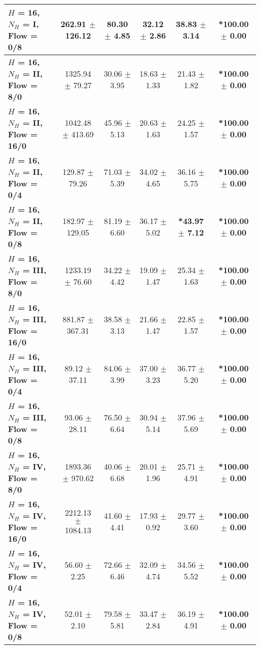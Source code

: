\begin{table*}[ht]
{\begin{tabular}{lccccc}
        \textbf{$H$ = 16, $N_H$ = I, Flow = 0/8} & 262.91 $\pm$ 126.12 & 80.30 $\pm$ 4.85 & 32.12 $\pm$ 2.86 & 38.83 $\pm$ 3.14 & \textbf{*100.00 $\pm$ 0.00} \\
        \midrule
        \textbf{$H$ = 16, $N_H$ = II, Flow = 8/0} & 1325.94 $\pm$ 79.27 & 30.06 $\pm$ 3.95 & 18.63 $\pm$ 1.33 & 21.43 $\pm$ 1.82 & \textbf{*100.00 $\pm$ 0.00} \\
        \textbf{$H$ = 16, $N_H$ = II, Flow = 16/0} & 1042.48 $\pm$ 413.69 & 45.96 $\pm$ 5.13 & 20.63 $\pm$ 1.63 & 24.25 $\pm$ 1.57 & \textbf{*100.00 $\pm$ 0.00} \\
        \textbf{$H$ = 16, $N_H$ = II, Flow = 0/4} & 129.87 $\pm$ 79.26 & 71.03 $\pm$ 5.39 & 34.02 $\pm$ 4.65 & 36.16 $\pm$ 5.75 & \textbf{*100.00 $\pm$ 0.00} \\
        \textbf{$H$ = 16, $N_H$ = II, Flow = 0/8} & 182.97 $\pm$ 129.05 & 81.19 $\pm$ 6.60 & 36.17 $\pm$ 5.02 & \textbf{*43.97 $\pm$ 7.12} & \textbf{*100.00 $\pm$ 0.00} \\
        \midrule
        \textbf{$H$ = 16, $N_H$ = III, Flow = 8/0} & 1233.19 $\pm$ 76.60 & 34.22 $\pm$ 4.42 & 19.09 $\pm$ 1.47 & 25.34 $\pm$ 1.63 & \textbf{*100.00 $\pm$ 0.00} \\
        \textbf{$H$ = 16, $N_H$ = III, Flow = 16/0} & 881.87 $\pm$ 367.31 & 38.58 $\pm$ 3.13 & 21.66 $\pm$ 1.47 & 22.85 $\pm$ 1.57 & \textbf{*100.00 $\pm$ 0.00} \\
        \textbf{$H$ = 16, $N_H$ = III, Flow = 0/4} & 89.12 $\pm$ 37.11 & 84.06 $\pm$ 3.99 & 37.00 $\pm$ 3.23 & 36.77 $\pm$ 5.20 & \textbf{*100.00 $\pm$ 0.00} \\
        \textbf{$H$ = 16, $N_H$ = III, Flow = 0/8} & 93.06 $\pm$ 28.11 & 76.50 $\pm$ 6.64 & 30.94 $\pm$ 5.14 & 37.96 $\pm$ 5.69 & \textbf{*100.00 $\pm$ 0.00} \\
        \midrule
        \textbf{$H$ = 16, $N_H$ = IV, Flow = 8/0} & 1893.36 $\pm$ 970.62 & 40.06 $\pm$ 6.68 & 20.01 $\pm$ 1.96 & 25.71 $\pm$ 4.91 & \textbf{*100.00 $\pm$ 0.00} \\
        \textbf{$H$ = 16, $N_H$ = IV, Flow = 16/0} & 2212.13 $\pm$ 1084.13 & 41.60 $\pm$ 4.41 & 17.93 $\pm$ 0.92 & 29.77 $\pm$ 3.60 & \textbf{*100.00 $\pm$ 0.00} \\
        \textbf{$H$ = 16, $N_H$ = IV, Flow = 0/4} & 56.60 $\pm$ 2.25 & 72.66 $\pm$ 6.46 & 32.09 $\pm$ 4.74 & 34.56 $\pm$ 5.52 & \textbf{*100.00 $\pm$ 0.00} \\
        \textbf{$H$ = 16, $N_H$ = IV, Flow = 0/8} & 52.01 $\pm$ 2.10 & 79.58 $\pm$ 5.81 & 33.47 $\pm$ 2.84 & 36.19 $\pm$ 4.91 & \textbf{*100.00 $\pm$ 0.00} \\

\end{tabular}}
\end{table*}
